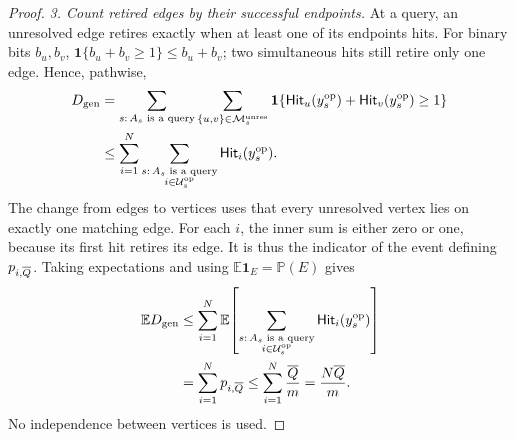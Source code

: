 \begin{proof}
\emph{3. Count retired edges by their successful endpoints.}
At a query, an unresolved edge retires exactly when at least one of its
endpoints hits. For binary bits \(b_u,b_v\),
\(\mathbf 1\{b_u+b_v\ge1\}\le b_u+b_v\); two simultaneous hits still retire
only one edge. Hence, pathwise,
\[
 \begin{aligned}
 \GenieDeletions
 &=\sum_{s:\,A_s\text{ is a query}}
   \sum_{\{u,v\}\in\OpUnresolvedMatching{s}}
   \mathbf 1\{\HardHit{\OpSubmittedState{s}}{u}
              +\HardHit{\OpSubmittedState{s}}{v}\ge1\}\\
 &\le
   \sum_{i=1}^N
   \sum_{\substack{s:\,A_s\text{ is a query}\\
                    i\in\OpUnresolvedVertices{s}}}
             \HardHit{\OpSubmittedState{s}}{i}.
 \end{aligned}
\]
The change from edges to vertices uses that every unresolved vertex lies
on exactly one matching edge.
For each \(i\), the inner sum is either zero or one, because its first
hit retires its edge. It is thus the indicator of the event defining
\(p_{i,\QueryBudget{}}\). Taking expectations and using
\(\mathbb E\mathbf 1_E=\mathbb P(E)\) gives
\[
 \begin{aligned}
 \mathbb E\GenieDeletions
 &\le
 \sum_{i=1}^N\mathbb E\!\left[
   \sum_{\substack{s:\,A_s\text{ is a query}\\
                    i\in\OpUnresolvedVertices{s}}}
             \HardHit{\OpSubmittedState{s}}{i}\right]\\
 &=\sum_{i=1}^N p_{i,\QueryBudget{}}
 \le\sum_{i=1}^N\frac{\QueryBudget{}}{\HardBankSize}
 =\frac{N\QueryBudget{}}{\HardBankSize}.
 \end{aligned}
\]
No independence between vertices is used.
\end{proof}
\FloatBarrier
